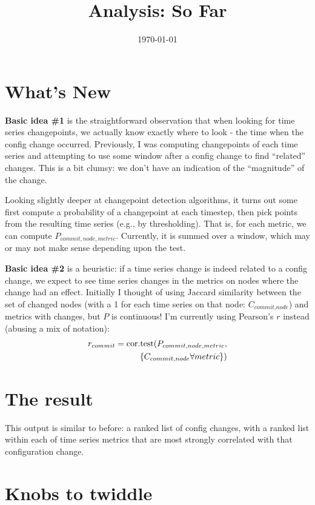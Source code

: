 \documentclass[twocolumn]{article}
\title{Analysis: So Far}
\date{\today}
\begin{document}
\maketitle

\section{What's New}

\textbf{Basic idea \#1} is the straightforward observation that when looking for time series changepoints, we actually know exactly where to look - the time when the config change occurred. Previously, I was computing changepoints of each time series and attempting to use some window after a config change to find ``related'' changes. This is a bit clumsy: we don't have an indication of the ``magnitude'' of the change.

Looking slightly deeper at changepoint detection algorithms, it turns out some first compute a probability of a changepoint at each timestep, then pick points from the resulting time series (e.g., by thresholding). That is, for each metric, we can compute $P_{\textit{commit},\textit{node},\textit{metric}}$. Currently, it is summed over a window, which may or may not make sense depending upon the test.

\textbf{Basic idea \#2} is a heuristic: if a time series change is indeed related to a config change, we expect to see time series changes in the metrics on nodes where the change had an effect. Initially I thought of using Jaccard similarity between the set of changed nodes (with a 1 for each time series on that node: $C_{\textit{commit},\textit{node}}$) and metrics with changes, but $P$ is continuous! I'm currently using Pearson's $r$ instead (abusing a mix of notation):
\begin{align*}
r_{commit}=\textup{cor.test}(P_{commit,node,metric}, \\ \{C_{commit,node} \forall metric\})
\end{align*}

\section{The result}

This output is similar to before: a ranked list of config changes, with a ranked list within each of time series metrics that are most strongly correlated with that configuration change.

\section{Knobs to twiddle}
\end{document}
